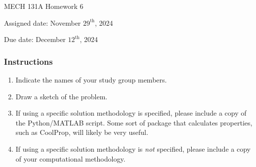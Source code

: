 \documentclass[12pt,letterpaper]{article}
\begin{document}
\noindent
MECH 131A Homework 6

\noindent
Assigned date: November $29^{\mathrm{th}}$, 2024

\noindent
Due date: December $12^{\mathrm{th}}$, 2024

\subsubsection*{Instructions}
\begin{enumerate}
	\item Indicate the names of your study group members.
	\item Draw a sketch of the problem.
	\item If using a specific solution methodology is specified, please include a copy of the Python/MATLAB script.
		Some sort of package that calculates properties, such as CoolProp, will likely be very useful. 
	\item If using a specific solution methodology is \textit{not} specified, please include a copy of your computational methodology.
\end{enumerate}
\end{document}
